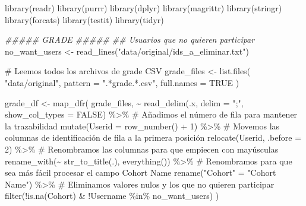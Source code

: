 \documentclass[
  12pt,
  a4paper,
  extrafontsizes,
  onecolumn,
  openright]{memoir}
\newenvironment{Shaded}{\begin{snugshade}}{\end{snugshade}}
\newcommand{\AttributeTok}[1]{\textcolor[rgb]{0.40,0.45,0.13}{#1}}
\newcommand{\CommentTok}[1]{\textcolor[rgb]{0.37,0.37,0.37}{#1}}
\newcommand{\ConstantTok}[1]{\textcolor[rgb]{0.56,0.35,0.01}{#1}}
\newcommand{\DecValTok}[1]{\textcolor[rgb]{0.68,0.00,0.00}{#1}}
\newcommand{\DocumentationTok}[1]{\textcolor[rgb]{0.37,0.37,0.37}{\textit{#1}}}
\newcommand{\FunctionTok}[1]{\textcolor[rgb]{0.28,0.35,0.67}{#1}}
\newcommand{\NormalTok}[1]{\textcolor[rgb]{0.00,0.23,0.31}{#1}}
\newcommand{\OtherTok}[1]{\textcolor[rgb]{0.00,0.23,0.31}{#1}}
\newcommand{\SpecialCharTok}[1]{\textcolor[rgb]{0.37,0.37,0.37}{#1}}
\newcommand{\StringTok}[1]{\textcolor[rgb]{0.13,0.47,0.30}{#1}}
\begin{document}
\begin{Shaded}
\begin{Highlighting}[]
\FunctionTok{library}\NormalTok{(readr)}
\FunctionTok{library}\NormalTok{(purrr)}
\FunctionTok{library}\NormalTok{(dplyr)}
\FunctionTok{library}\NormalTok{(magrittr)}
\FunctionTok{library}\NormalTok{(stringr)}
\FunctionTok{library}\NormalTok{(forcats)}
\FunctionTok{library}\NormalTok{(testit)}
\FunctionTok{library}\NormalTok{(tidyr)}

\DocumentationTok{\#\#\#\#\# GRADE \#\#\#\#\#}
\DocumentationTok{\#\# Usuarios que no quieren participar}
\NormalTok{no\_want\_users }\OtherTok{\textless{}{-}} \FunctionTok{read\_lines}\NormalTok{(}\StringTok{"data/original/ids\_a\_eliminar.txt"}\NormalTok{)}

\CommentTok{\# Leemos todos los archivos de grade CSV}
\NormalTok{grade\_files }\OtherTok{\textless{}{-}} \FunctionTok{list.files}\NormalTok{(}
    \StringTok{"data/original"}\NormalTok{, }\AttributeTok{pattern =} \StringTok{".*grade.*.csv"}\NormalTok{, }\AttributeTok{full.names =} \ConstantTok{TRUE}
\NormalTok{)}

\NormalTok{grade\_df }\OtherTok{\textless{}{-}} \FunctionTok{map\_dfr}\NormalTok{(}
\NormalTok{    grade\_files, }\SpecialCharTok{\textasciitilde{}} \FunctionTok{read\_delim}\NormalTok{(.x, }\AttributeTok{delim =} \StringTok{";"}\NormalTok{, }\AttributeTok{show\_col\_types =} \ConstantTok{FALSE}\NormalTok{) }\SpecialCharTok{\%\textgreater{}\%}
        \CommentTok{\# Añadimos el número de fila para mantener la trazabilidad}
        \FunctionTok{mutate}\NormalTok{(}\AttributeTok{Userid =} \FunctionTok{row\_number}\NormalTok{() }\SpecialCharTok{+} \DecValTok{1}\NormalTok{) }\SpecialCharTok{\%\textgreater{}\%} 
        \CommentTok{\# Movemos las columnas de identificación de fila a la primera posición}
        \FunctionTok{relocate}\NormalTok{(Userid, }\AttributeTok{.before =} \DecValTok{2}\NormalTok{) }\SpecialCharTok{\%\textgreater{}\%}
        \CommentTok{\# Renombramos las columnas para que empiecen con mayúsculas}
        \FunctionTok{rename\_with}\NormalTok{(}\SpecialCharTok{\textasciitilde{}} \FunctionTok{str\_to\_title}\NormalTok{(.), }\FunctionTok{everything}\NormalTok{()) }\SpecialCharTok{\%\textgreater{}\%} 
        \CommentTok{\# Renombramos para que sea más fácil procesar el campo Cohort Name}
        \FunctionTok{rename}\NormalTok{(}\StringTok{"Cohort"} \OtherTok{=} \StringTok{"Cohort Name"}\NormalTok{) }\SpecialCharTok{\%\textgreater{}\%}
        \CommentTok{\# Eliminamos valores nulos y los que no quieren participar}
        \FunctionTok{filter}\NormalTok{(}\SpecialCharTok{!}\FunctionTok{is.na}\NormalTok{(Cohort) }\SpecialCharTok{\&} \SpecialCharTok{!}\NormalTok{Username }\SpecialCharTok{\%in\%}\NormalTok{ no\_want\_users) }
\NormalTok{)}


\end{Highlighting}
\end{Shaded}
\end{document}
